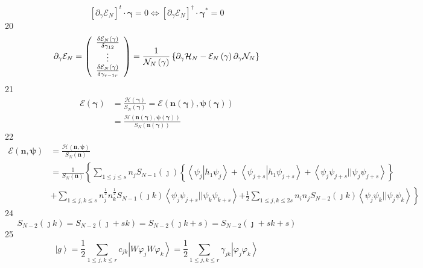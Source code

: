 \documentclass[aps,preprint]{revtex4}%
\begin{document}
\[
\left[  \partial_{\gamma}\mathcal{E}_{N}\right]  ^{t}\cdot\mathbf{\gamma
}=0\Leftrightarrow\left[  \partial_{\gamma}\mathcal{E}_{N}\right]  ^{\dagger
}\cdot\mathbf{\gamma}^{\ast}=0
\]
20%
\[
\partial_{\gamma}\mathcal{E}_{N}=\left(
\begin{array}
[c]{c}%
\frac{\delta\mathcal{E}_{N}\left(  \mathbf{\gamma}\right)  }{\delta\gamma
_{12}}\\
\vdots\\
\frac{\delta\mathcal{E}_{N}\left(  \mathbf{\gamma}\right)  }{\delta
\gamma_{r-1r}}%
\end{array}
\right)  =\frac{1}{\mathcal{N}_{N}\left(  \mathbf{\gamma}\right)  }\left\{
\partial_{\gamma}\mathcal{H}_{N}-\mathcal{E}_{N}\left(  \mathbf{\gamma
}\right)  \partial_{\gamma}\mathcal{N}_{N}\right\}
\]
21%
\begin{align*}
\mathcal{E}\left(  \mathbf{\gamma}\right)   &  =\frac{\mathcal{H}\left(
\mathbf{\gamma}\right)  }{S_{N}\left(  \mathbf{\gamma}\right)  }%
=\mathcal{E}\left(  \mathbf{n\left(  \mathbf{\gamma}\right)  ,\psi}\left(
\mathbf{\gamma}\right)  \right) \\
&  =\frac{\mathcal{H}\left(  \mathbf{n\left(  \mathbf{\gamma}\right)  ,\psi
}\left(  \mathbf{\gamma}\right)  \right)  }{S_{N}\left(  \mathbf{n}\left(
\mathbf{\gamma}\right)  \right)  }%
\end{align*}
22%
\begin{align*}
\mathcal{E}\left(  \mathbf{n,\psi}\right)   &  =\frac{\mathcal{H}\left(
\mathbf{n,\psi}\right)  }{S_{N}\left(  \mathbf{n}\right)  }\\
&  =\frac{1}{S_{N}\left(  \mathbf{n}\right)  }\left\{  \sum_{1\leq j\leq
s}n_{j}S_{N-1}\left(  \jmath\right)  \left\{  \left\langle \psi_{j}\left\vert
h_{1}\psi_{j}\right.  \right\rangle +\left\langle \psi_{j+s}\left\vert
h_{1}\psi_{j+s}\right.  \right\rangle +\left\langle \psi_{j}\psi_{j+s}%
||\psi_{j}\psi_{j+s}\right\rangle \right\}  \right. \\
&  +\sum_{1\leq j,k\leq s}n_{j}^{\frac{1}{2}}n_{k}^{\frac{1}{2}}S_{N-1}\left(
\jmath k\right)  \left\langle \psi_{j}\psi_{j+s}||\psi_{k}\psi_{k+s}%
\right\rangle \left.  +\frac{1}{2}\sum_{1\leq j,k\leq2s}n_{i}n_{j}%
S_{N-2}\left(  \jmath k\right)  \left\langle \psi_{j}\psi_{k}||\psi_{j}%
\psi_{k}\right\rangle \right\}
\end{align*}
24%
\[
S_{N-2}\left(  \jmath k\right)  =S_{N-2}\left(  \jmath+sk\right)
=S_{N-2}\left(  \jmath k+s\right)  =S_{N-2}\left(  \jmath+sk+s\right)
\]
25%
\[
\left\vert g\right\rangle =\frac{1}{2}\sum_{1\leq j,k\leq r}c_{jk}\left\vert
W\varphi_{j}W\varphi_{k}\right\rangle =\frac{1}{2}\sum_{1\leq j,k\leq r}%
\gamma_{jk}\left\vert \varphi_{j}\varphi_{k}\right\rangle
\]%
\end{document}

